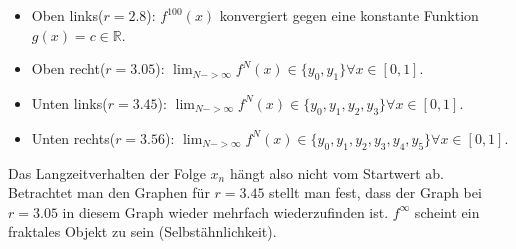 \documentclass[11,5pt, twoside]{article}
\begin{document}
\begin{itemize}
\item Oben links($r=2.8$): $f^{100}(x)$ konvergiert gegen eine konstante Funktion $g(x)=c \in \mathbb{R}$.
\item Oben recht($r=3.05$): $\lim_{N->\infty} f^N(x) \in \{y_0, y_1\} \forall x \in [0,1]$.
\item Unten links($r=3.45$): $\lim_{N->\infty} f^N(x) \in \{y_0, y_1, y_2, y_3\} \forall x \in [0,1]$.
\item Unten rechts($r=3.56$): $\lim_{N->\infty} f^N(x) \in \{y_0, y_1, y_2, y_3, y_4, y_5\} \forall x \in [0,1]$.
\end{itemize}
Das Langzeitverhalten der Folge $x_n$ hängt also nicht vom Startwert ab. 
Betrachtet man den Graphen für $r=3.45$ stellt man fest, dass der Graph bei $r=3.05$ in diesem Graph wieder mehrfach wiederzufinden ist. $f^{\infty}$ scheint ein fraktales Objekt zu sein (Selbstähnlichkeit). 
\end{document}
